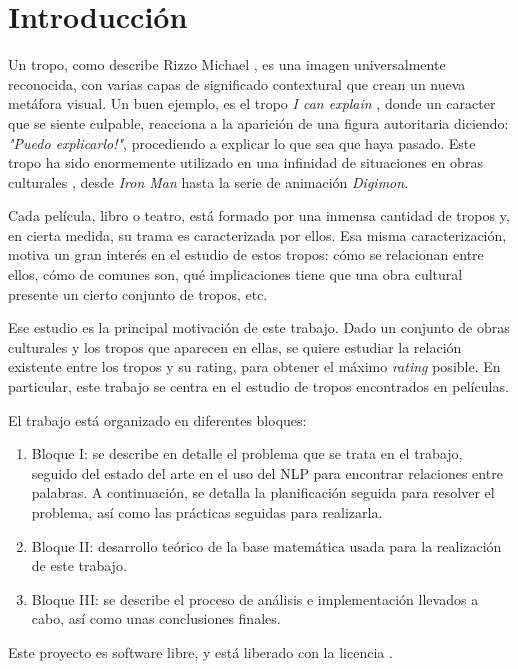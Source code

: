 \chapter{Introducción}

Un tropo, como describe Rizzo Michael \cite{rizzo2013art}, es una imagen
universalmente reconocida, con varias capas de significado contextural que
crean un nueva metáfora visual. Un buen ejemplo, es el tropo \emph{I can
    explain} \cite{tropo:ICanExplain}, donde un caracter que se siente culpable,
reacciona a la aparición de una figura autoritaria diciendo: \emph{"Puedo
    explicarlo!"}, procediendo a explicar lo que sea que haya pasado. Este tropo ha
sido enormemente utilizado en una infinidad de situaciones en obras culturales
\cite{tropo:ICanExplain}, desde \emph{Iron Man} hasta la serie de animación
\emph{Digimon}.

Cada película, libro o teatro, está formado por una inmensa cantidad de tropos
y, en cierta medida, su trama es caracterizada por ellos. Esa misma
caracterización, motiva un gran interés en el estudio de estos tropos: cómo se
relacionan entre ellos, cómo de comunes son, qué implicaciones tiene que una
obra cultural presente un cierto conjunto de tropos, etc.

Ese estudio es la principal motivación de este trabajo. Dado un conjunto de
obras culturales y los tropos que aparecen en ellas, se quiere estudiar la
relación existente entre los tropos y su rating, para obtener el máximo \emph
{rating} posible. En particular, este trabajo se centra en el estudio de tropos
encontrados en películas.


El trabajo está organizado en diferentes bloques:

\begin{enumerate}
    \item Bloque I: se describe en detalle el problema que se trata en el
          trabajo, seguido del estado del arte en el uso del NLP para encontrar
          relaciones entre palabras. A continuación, se detalla la planificación
          seguida para resolver el problema, así como las prácticas seguidas para
          realizarla.
    \item Bloque II: desarrollo teórico de la base matemática usada para la
          realización de este trabajo.
    \item Bloque III: se describe el proceso de análisis e implementación
          llevados a cabo, así como unas conclusiones finales.
\end{enumerate}

Este proyecto es software libre, y está liberado con la licencia \cite{gplv3}.